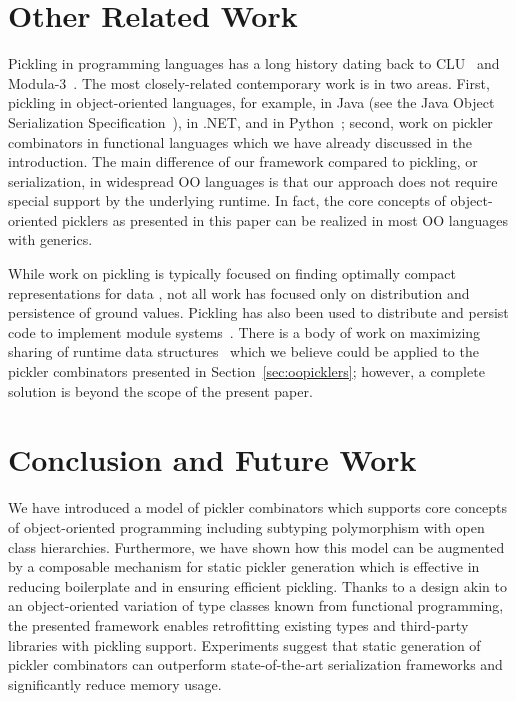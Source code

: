 \documentclass[preprint,10pt]{sigplanconf}
\theoremstyle{definition}
\theoremstyle{definition}
\begin{document}
\section{Other Related Work}
\label{sec:related-work}

Pickling in programming languages has a long history dating back to
CLU~\cite{HerlihyL82} and Modula-3~\cite{CardelliDJKN89}. The most
closely-related contemporary work is in two areas. First, pickling in
object-oriented languages, for example, in Java (see the Java Object
Serialization Specification~\cite{JavaSerialization}), in .NET, and in
Python~\cite{Rossum07}; second, work on pickler combinators in
functional languages which we have already discussed in the
introduction. The main difference of our framework compared to
pickling, or serialization, in widespread OO languages is that our
approach does not require special support by the underlying
runtime. In fact, the core concepts of object-oriented picklers as
presented in this paper can be realized in most OO languages with
generics.

While work on pickling is typically focused on finding optimally compact
representations for data \cite{EveryBitCounts}, not all work has focused only
on distribution and persistence of ground values. Pickling has also been
used to distribute and persist code to implement module systems~\cite{Roy99,Rossberg2007}.
There is a body of work on maximizing sharing of runtime data
structures~\cite{appel93hashconsing,Elsman2005,TackKS06} which we believe
could be applied to the pickler combinators presented in
Section~\ref{sec:oopicklers}; however, a complete solution is beyond the scope
of the present paper.



\section{Conclusion and Future Work}

We have introduced a model of pickler combinators which supports core
concepts of object-oriented programming including subtyping polymorphism
with open class hierarchies. Furthermore, we have shown how this model
can be augmented by a composable mechanism for static pickler
generation which is effective in reducing boilerplate and in ensuring
efficient pickling. Thanks to a design akin to an object-oriented
variation of type classes known from functional programming, the
presented framework enables retrofitting existing types and
third-party libraries with pickling support. Experiments suggest that
static generation of pickler combinators can outperform
state-of-the-art serialization frameworks and significantly reduce
memory usage.
\end{document}
